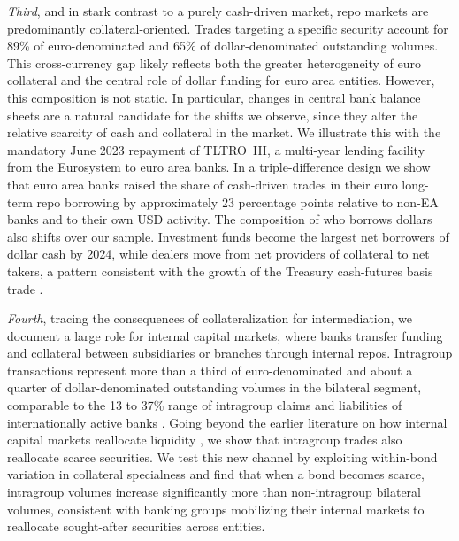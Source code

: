 \documentclass[english, 12pt, oneside]{article}
\begin{document}
\emph{Third}, and in stark contrast to a purely cash-driven market, repo markets are predominantly collateral-oriented.
Trades targeting a specific security account for 89\% of euro-denominated and 65\% of dollar-denominated outstanding volumes. This cross-currency gap likely reflects both the greater heterogeneity of euro collateral \citep{ehrmann2017, jiang2020} and the central role of dollar funding for euro area entities. 
However, this composition is not static. In particular, changes in central bank balance sheets are a natural candidate for the shifts we observe, since they alter the relative scarcity of cash and collateral in the market. We illustrate this with the mandatory June 2023 repayment of TLTRO~III, a multi-year lending facility from the Eurosystem to euro area banks. In a triple-difference design we show that euro area banks raised the share of cash-driven trades in their euro long-term repo borrowing by approximately 23 percentage points relative to non-EA banks and to their own USD activity. The composition of who borrows dollars also shifts over our sample. Investment funds become the largest net borrowers of dollar cash by 2024, while dealers move from net providers of collateral to net takers, a pattern consistent with the growth of the Treasury cash-futures basis trade \citep{barth2025, kashyap2025, kruttli2025ltcm}.

\emph{Fourth}, tracing the consequences of collateralization for intermediation, we document a large role for internal capital markets, where banks transfer funding and collateral between subsidiaries or branches through internal repos. Intragroup transactions represent more than a third of euro-denominated and about a quarter of dollar-denominated outstanding volumes in the bilateral segment, comparable to the 13 to 37\% range of intragroup claims and liabilities of internationally active banks \citep{hardy2024}. 
Going beyond the earlier literature on how internal capital markets reallocate liquidity \citep{cetorelli2012}, we show that intragroup trades also reallocate scarce securities. We test this new channel by exploiting within-bond variation in collateral specialness and find that when a bond becomes scarce, intragroup volumes increase significantly more than non-intragroup bilateral volumes, consistent with banking groups mobilizing their internal markets to reallocate sought-after securities across entities.
\end{document}
